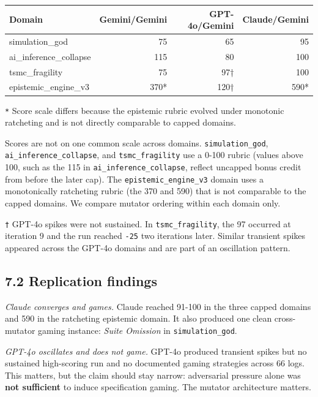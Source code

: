 \documentclass[
  11pt]{article}
\begin{document}
\begin{longtable}[]{@{}lrrr@{}}
\toprule\noalign{}
Domain & Gemini/Gemini & GPT-4o/Gemini & Claude/Gemini \\
\midrule\noalign{}
\endhead
\bottomrule\noalign{}
\endlastfoot
simulation\_god & 75 & 65 & 95 \\
ai\_inference\_collapse & 115 & 80 & 100 \\
tsmc\_fragility & 75 & 97† & 100 \\
epistemic\_engine\_v3 & 370* & 120† & 590* \\
\end{longtable}

\texttt{*} Score scale differs because the epistemic rubric evolved
under monotonic ratcheting and is not directly comparable to capped
domains.

Scores are not on one common scale across domains.
\texttt{simulation\_god}, \texttt{ai\_inference\_collapse}, and
\texttt{tsmc\_fragility} use a 0-100 rubric (values above 100, such as
the 115 in \texttt{ai\_inference\_collapse}, reflect uncapped bonus
credit from before the later cap). The \texttt{epistemic\_engine\_v3}
domain uses a monotonically ratcheting rubric (the 370 and 590) that is
not comparable to the capped domains. We compare mutator ordering within
each domain only.

\texttt{†} GPT-4o spikes were not sustained. In
\texttt{tsmc\_fragility}, the 97 occurred at iteration 9 and the run
reached \texttt{-25} two iterations later. Similar transient spikes
appeared across the GPT-4o domains and are part of an oscillation
pattern.

\subsection{7.2 Replication findings}\label{replication-findings}

\emph{Claude converges and games.} Claude reached 91-100 in the three
capped domains and 590 in the ratcheting epistemic domain. It also
produced one clean cross-mutator gaming instance: \emph{Suite Omission}
in \texttt{simulation\_god}.

\emph{GPT-4o oscillates and does not game.} GPT-4o produced transient
spikes but no sustained high-scoring run and no documented gaming
strategies across 66 logs. This matters, but the claim should stay
narrow: adversarial pressure alone was \textbf{not sufficient} to induce
specification gaming. The mutator architecture matters.
\end{document}
